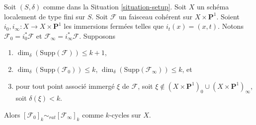 \begin{lemma}
\label{lemma-coherent-sheaf-cross-p1}
Soit $(S, \delta)$ comme dans la Situation \ref{situation-setup}.
Soit $X$ un schéma localement de type fini sur $S$.
Soit $\mathcal{F}$ un faisceau cohérent sur $X \times \mathbf{P}^1$.
Soient $i_0, i_\infty : X \to X \times \mathbf{P}^1$ les immersions fermées
telles que $i_t(x) = (x, t)$. Notons $\mathcal{F}_0 = i_0^*\mathcal{F}$ et
$\mathcal{F}_\infty = i_\infty^*\mathcal{F}$.
Supposons
\begin{enumerate}
\item $\dim_\delta(\text{Supp}(\mathcal{F})) \leq k + 1$,
\item $\dim_\delta(\text{Supp}(\mathcal{F}_0)) \leq k$,
$\dim_\delta(\text{Supp}(\mathcal{F}_\infty)) \leq k$, et
\item pour tout point associé immergé $\xi$ de $\mathcal{F}$, soit
$\xi \not \in (X \times \mathbf{P}^1)_0 \cup (X \times \mathbf{P}^1)_\infty$,
soit $\delta(\xi) < k$.
\end{enumerate}
Alors $[\mathcal{F}_0]_k \sim_{rat} [\mathcal{F}_\infty]_k$ comme $k$-cycles sur $X$.
\end{lemma}

